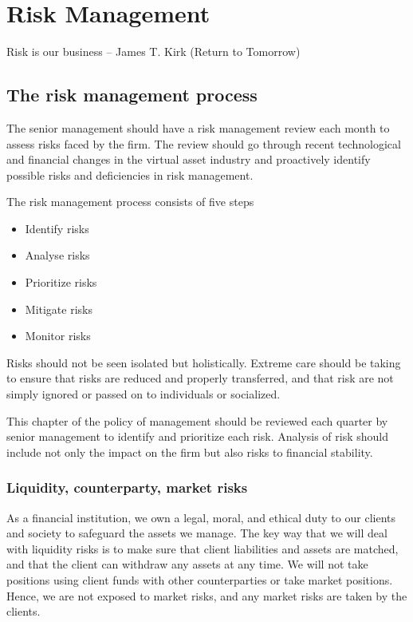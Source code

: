 \chapter{Risk Management}

Risk is our business – James T. Kirk (Return to Tomorrow)



\section{The risk management process}

The senior management should have a risk management review each month
to assess risks faced by the firm.  The review should go through
recent technological and financial changes in the virtual asset
industry and proactively identify possible risks and deficiencies in
risk management.

The risk management process consists of five steps
\begin{itemize}
\item Identify risks
\item Analyse risks
\item Prioritize risks
\item Mitigate risks
\item Monitor risks
\end{itemize}

Risks should not be seen isolated but holistically.  Extreme care
should be taking to ensure that risks are reduced and properly
transferred, and that risk are not simply ignored or passed on to
individuals or socialized.

This chapter of the policy of management should be reviewed each quarter
by senior management to identify and prioritize each risk.
Analysis of risk should include not only the impact on the firm but also
risks to financial stability.

\subsection{Liquidity, counterparty, market risks}


As a financial institution, we own a legal, moral, and ethical duty to
our clients and society to safeguard the assets we manage.  The key
way that we will deal with liquidity risks is to make sure that client
liabilities and assets are matched, and that the client can
withdraw any assets at any time.  We will not take positions using
client funds with other counterparties or take market positions. Hence,
we are not exposed to market risks, and any market risks are taken by
the clients.

